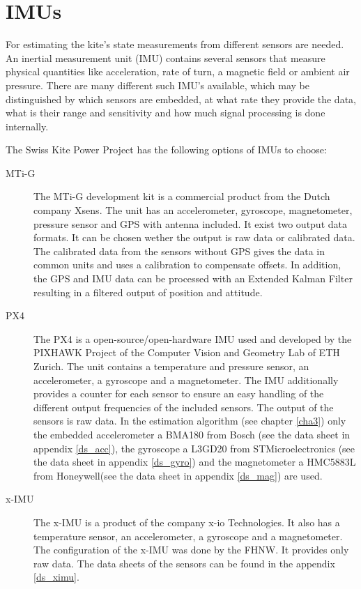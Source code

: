 \chapter{IMUs}\label{cha2}

For estimating the kite's state measurements from different sensors are needed. An inertial measurement unit (IMU) contains several sensors that measure physical quantities like acceleration, rate of turn, a magnetic field or ambient air pressure. There are many different such IMU's available, which may be distinguished by which sensors are embedded, at what rate they provide the data, what is their range and sensitivity and how much signal processing is done internally.

The Swiss Kite Power Project has the following options of IMUs to choose:

\begin{description}
\item[MTi-G]
The MTi-G development kit is a commercial product from the Dutch company Xsens. The unit has an accelerometer, gyroscope, magnetometer, pressure sensor and GPS with antenna included. It exist two output data formats. It can be chosen wether the output is raw data or calibrated data. The calibrated data from the sensors without GPS gives the data in common units and uses a calibration to compensate offsets. In addition, the GPS and IMU data can be processed with an Extended Kalman Filter resulting in a filtered output of position and attitude.

\item[PX4]
The PX4 is a open-source/open-hardware IMU used and developed by the PIXHAWK Project of the Computer Vision and Geometry Lab of ETH Zurich. The unit contains a temperature and pressure sensor, an accelerometer, a gyroscope and a magnetometer. The IMU additionally provides a counter for each sensor to ensure an easy handling of the different output frequencies of the included sensors. The output of the sensors is raw data. In the estimation algorithm (see chapter \ref{cha3}) only the embedded accelerometer a BMA180 from Bosch (see the data sheet in appendix \ref{ds_acc}), the gyroscope a L3GD20 from STMicroelectronics (see the data sheet in appendix \ref {ds_gyro}) and the magnetometer a HMC5883L from Honeywell(see the data sheet in appendix \ref{ds_mag}) are used.

\item[x-IMU]
The x-IMU is a product of the company x-io Technologies. It also has a temperature sensor, an accelerometer, a gyroscope and a magnetometer. The configuration of the x-IMU was done by the FHNW. It provides only raw data. The data sheets of the sensors can be found in the appendix \ref{ds_ximu}.
\end{description}



